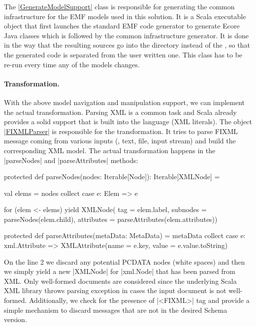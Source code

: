 The \href{https://github.com/fikovnik/ttc14-fixml-sigma/blob/master/ttc14-fixml-base/src/fr/inria/spirals/sigma/ttc14/fixml/support/GenerateModelSupport.scala}{\Scala|GenerateModelSupport|} class is responsible for generating the common infrastructure for the EMF models used in this solution.
It is a Scala executable object that first launches the standard EMF code generator to generate Ecore Java classes which is followed by the \SIGMA common infrastructure generator.
It is done in the way that the resulting sources go into the  directory instead of the , so that the generated code is separated from the user written one.
This class has to be re-run every time any of the models changes.

\paragraph{Transformation.}
%
With the above model navigation and manipulation support, we can implement the actual transformation.
Parsing XML is a common task and Scala already provides a solid support that is built into the language (\Eg XML literals).
The object \href{https://github.com/fikovnik/ttc14-fixml-sigma/blob/master/ttc14-fixml-base/src/fr/inria/spirals/sigma/ttc14/fixml/FIXMLParser.scala}{\Scala|FIXMLParser|} is responsible for the transformation.
It tries to parse FIXML message coming from various inputs (\Eg, text, file, input stream) and build the corresponding XML model.
The actual transformation happens in the \Scala|parseNodes| and \Scala|parseAttributes| methods:

\begin{scalacode}
protected def parseNodes(nodes: Iterable[Node]): Iterable[XMLNode] = {
  val elems = nodes collect { case e: Elem => e }

  for (elem <- elems) yield XMLNode(
    tag = elem.label,
    subnodes = parseNodes(elem.child),
    attributes = parseAttributes(elem.attributes))
}

protected def parseAttributes(metaData: MetaData) =
  metaData collect {
    case e: xml.Attribute => XMLAttribute(name = e.key, value = e.value.toString)
  }
\end{scalacode}

On the line 2 we discard any potential PCDATA nodes (\Eg white spaces) and then we simply yield a new \Scala|XMLNode| for \Scala|xml.Node| that has been parsed from XML.
Only well-formed documents are considered since the underlying Scala XML library throws parsing exception in cases the input document is not well-formed.
Additionally, we check for the presence of \xmlinline|<FIXML>| tag and provide a simple mechanism to discard \FIXML messages that are not in the desired  Schema version.

